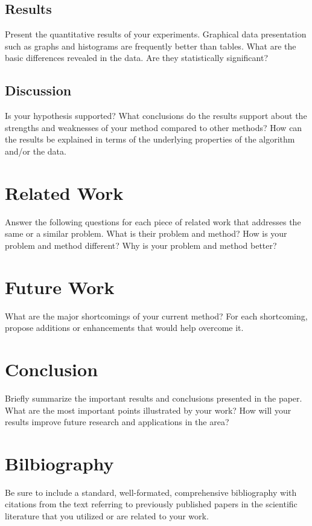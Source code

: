\documentclass[conference,draft]{IEEEtran}
\begin{document}
\subsection{Results}

Present the quantitative results of your experiments. Graphical data
presentation such as graphs and histograms are frequently better than tables.
What are the basic differences revealed in the data. Are they statistically
significant? 

\subsection{Discussion}

Is your hypothesis supported? What conclusions do the results support about the
strengths and weaknesses of your method compared to other methods? How can the
results be explained in terms of the underlying properties of the algorithm
and/or the data. 

\section{Related Work}

Answer the following questions for each piece of related work that addresses
the same or a similar problem. What is their problem and method? How is your
problem and method different? Why is your problem and method better? 

\section{Future Work}

What are the major shortcomings of your current method? For each shortcoming,
propose additions or enhancements that would help overcome it. 

\section{Conclusion}

Briefly summarize the important results and conclusions presented in the paper.
What are the most important points illustrated by your work? How will your
results improve future research and applications in the area? 

\section{Bilbiography}

Be sure to include a standard, well-formated, comprehensive bibliography with
citations from the text referring to previously published papers in the
scientific literature that you utilized or are related to your work.

{}

\end{document}
